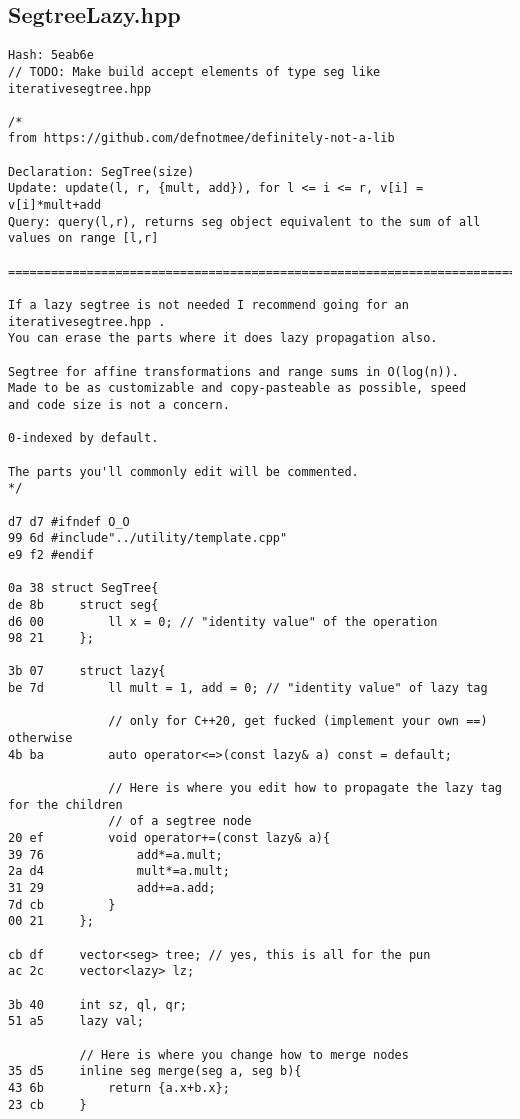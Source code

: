 \documentclass[11pt, a4paper, twoside]{article}
\begin{document}
\subsection{SegtreeLazy.hpp}
\begin{lstlisting}
Hash: 5eab6e
// TODO: Make build accept elements of type seg like iterativesegtree.hpp

/*
from https://github.com/defnotmee/definitely-not-a-lib

Declaration: SegTree(size)
Update: update(l, r, {mult, add}), for l <= i <= r, v[i] = v[i]*mult+add
Query: query(l,r), returns seg object equivalent to the sum of all values on range [l,r]

=============================================================================

If a lazy segtree is not needed I recommend going for an iterativesegtree.hpp .
You can erase the parts where it does lazy propagation also.

Segtree for affine transformations and range sums in O(log(n)).
Made to be as customizable and copy-pasteable as possible, speed 
and code size is not a concern. 

0-indexed by default.

The parts you'll commonly edit will be commented.
*/

d7 d7 #ifndef O_O
99 6d #include"../utility/template.cpp"
e9 f2 #endif

0a 38 struct SegTree{
de 8b     struct seg{
d6 00         ll x = 0; // "identity value" of the operation
98 21     };
      
3b 07     struct lazy{
be 7d         ll mult = 1, add = 0; // "identity value" of lazy tag
      
              // only for C++20, get fucked (implement your own ==) otherwise
4b ba         auto operator<=>(const lazy& a) const = default;
      
              // Here is where you edit how to propagate the lazy tag for the children
              // of a segtree node
20 ef         void operator+=(const lazy& a){
39 76             add*=a.mult;
2a d4             mult*=a.mult;
31 29             add+=a.add;
7d cb         }
00 21     };
      
cb df     vector<seg> tree; // yes, this is all for the pun
ac 2c     vector<lazy> lz;
      
3b 40     int sz, ql, qr;
51 a5     lazy val;
      
          // Here is where you change how to merge nodes
35 d5     inline seg merge(seg a, seg b){
43 6b         return {a.x+b.x};
23 cb     }
      

\end{lstlisting}
\end{document}
